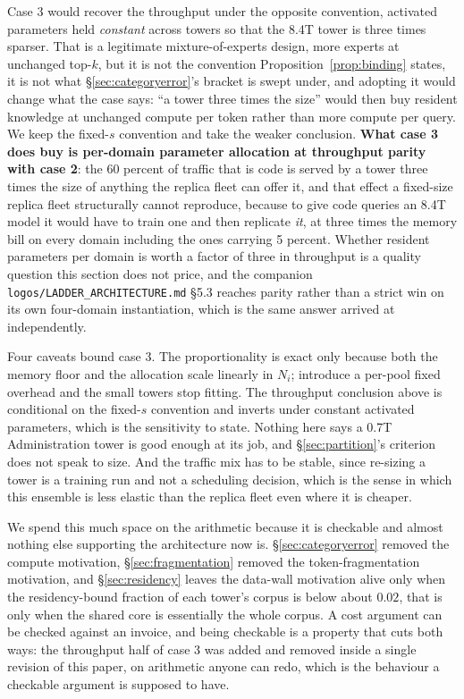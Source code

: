 \documentclass[11pt]{article}
\begin{document}
Case 3 would recover the throughput under the opposite convention, activated parameters held \emph{constant} across towers so that the 8.4T tower is three times sparser. That is a legitimate mixture-of-experts design, more experts at unchanged top-$k$, but it is not the convention Proposition~\ref{prop:binding} states, it is not what \S\ref{sec:categoryerror}'s bracket is swept under, and adopting it would change what the case says: ``a tower three times the size'' would then buy resident knowledge at unchanged compute per token rather than more compute per query. We keep the fixed-$s$ convention and take the weaker conclusion. \textbf{What case 3 does buy is per-domain parameter allocation at throughput parity with case 2}: the 60 percent of traffic that is code is served by a tower three times the size of anything the replica fleet can offer it, and that effect a fixed-size replica fleet structurally cannot reproduce, because to give code queries an 8.4T model it would have to train one and then replicate \emph{it}, at three times the memory bill on every domain including the ones carrying 5 percent. Whether resident parameters per domain is worth a factor of three in throughput is a quality question this section does not price, and the companion \texttt{logos/LADDER\_ARCHITECTURE.md} \S5.3 reaches parity rather than a strict win on its own four-domain instantiation, which is the same answer arrived at independently.

Four caveats bound case 3. The proportionality is exact only because both the memory floor and the allocation scale linearly in $N_i$; introduce a per-pool fixed overhead and the small towers stop fitting. The throughput conclusion above is conditional on the fixed-$s$ convention and inverts under constant activated parameters, which is the sensitivity to state. Nothing here says a 0.7T Administration tower is good enough at its job, and \S\ref{sec:partition}'s criterion does not speak to size. And the traffic mix has to be stable, since re-sizing a tower is a training run and not a scheduling decision, which is the sense in which this ensemble is less elastic than the replica fleet even where it is cheaper.

We spend this much space on the arithmetic because it is checkable and almost nothing else supporting the architecture now is. \S\ref{sec:categoryerror} removed the compute motivation, \S\ref{sec:fragmentation} removed the token-fragmentation motivation, and \S\ref{sec:residency} leaves the data-wall motivation alive only when the residency-bound fraction of each tower's corpus is below about $0.02$, that is only when the shared core is essentially the whole corpus. A cost argument can be checked against an invoice, and being checkable is a property that cuts both ways: the throughput half of case 3 was added and removed inside a single revision of this paper, on arithmetic anyone can redo, which is the behaviour a checkable argument is supposed to have.
\end{document}
